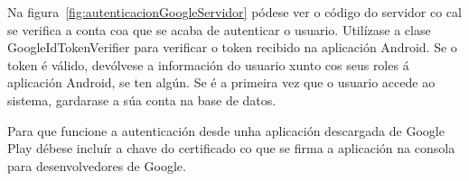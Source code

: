 Na figura~\ref{fig:autenticacionGoogleServidor} pódese ver o código do servidor co cal se verifica a conta coa que se acaba de autenticar o usuario. Utilízase a clase GoogleIdTokenVerifier para verificar o token recibido na aplicación Android. Se o token é válido, devólvese a información do usuario xunto cos seus roles á aplicación Android, se ten algún. Se é a primeira vez que o usuario accede ao sistema, gardarase a súa conta na base de datos.

Para que funcione a autenticación desde unha aplicación descargada de Google Play débese incluír a chave do certificado co que se firma a aplicación na consola para desenvolvedores de Google.


